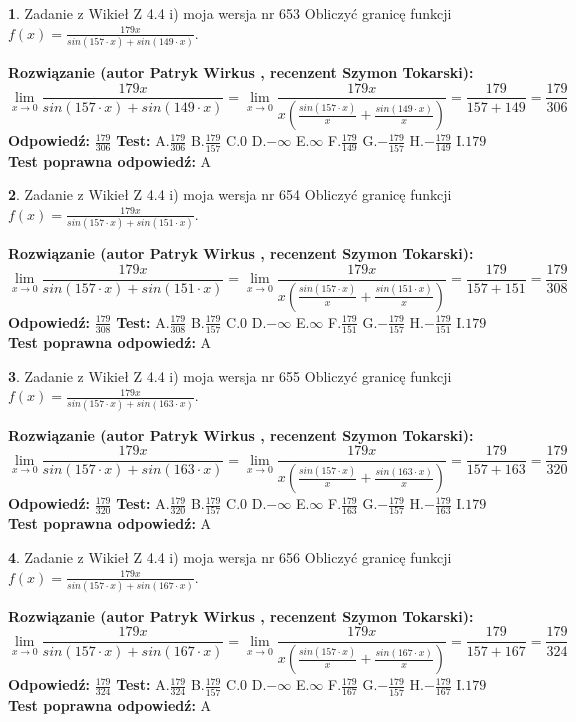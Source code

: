 \documentclass[12pt, a4paper]{article}
\theoremstyle{definition} %
\newtheorem{zad}{}
\newcommand{\zadStart}[1]{\begin{zad}#1\newline}
\newcommand{\zadStop}{\end{zad}}
\newcommand{\rozwStart}[2]{\noindent \textbf{Rozwiązanie (autor #1 , recenzent #2): }\newline}
\newcommand{\rozwStop}{\newline}
\newcommand{\odpStart}{\noindent \textbf{Odpowiedź:}\newline}
\newcommand{\odpStop}{\newline}
\newcommand{\testStart}{\noindent \textbf{Test:}\newline}
\newcommand{\testStop}{\newline}
\newcommand{\kluczStart}{\noindent \textbf{Test poprawna odpowiedź:}\newline}
\newcommand{\kluczStop}{\newline}
\begin{document}
\zadStart{Zadanie z Wikieł Z 4.4 i) moja wersja nr 653}
Obliczyć granicę funkcji $f(x)=\frac{179x}{sin(157\cdot x) +sin(149\cdot x)}$.
\zadStop
\rozwStart{Patryk Wirkus}{Szymon Tokarski}
$$\lim\limits_{x\to 0}\frac{179x}{sin(157\cdot x) +sin(149\cdot x)}=\lim\limits_{x\to 0}\frac{179x}{x(\frac{sin(157\cdot x)}{x}+\frac{sin(149\cdot x)}{x})}=\frac{179}{157+149} = \frac{179}{306}$$
\rozwStop
\odpStart
$\frac{179}{306}$
\odpStop
\testStart
A.$\frac{179}{306}$
B.$\frac{179}{157}$
C.$0$
D.$-\infty$
E.$\infty$
F.$\frac{179}{149}$
G.$-\frac{179}{157}$
H.$-\frac{179}{149}$
I.$179$
\testStop
\kluczStart
A
\kluczStop



\zadStart{Zadanie z Wikieł Z 4.4 i) moja wersja nr 654}
Obliczyć granicę funkcji $f(x)=\frac{179x}{sin(157\cdot x) +sin(151\cdot x)}$.
\zadStop
\rozwStart{Patryk Wirkus}{Szymon Tokarski}
$$\lim\limits_{x\to 0}\frac{179x}{sin(157\cdot x) +sin(151\cdot x)}=\lim\limits_{x\to 0}\frac{179x}{x(\frac{sin(157\cdot x)}{x}+\frac{sin(151\cdot x)}{x})}=\frac{179}{157+151} = \frac{179}{308}$$
\rozwStop
\odpStart
$\frac{179}{308}$
\odpStop
\testStart
A.$\frac{179}{308}$
B.$\frac{179}{157}$
C.$0$
D.$-\infty$
E.$\infty$
F.$\frac{179}{151}$
G.$-\frac{179}{157}$
H.$-\frac{179}{151}$
I.$179$
\testStop
\kluczStart
A
\kluczStop



\zadStart{Zadanie z Wikieł Z 4.4 i) moja wersja nr 655}
Obliczyć granicę funkcji $f(x)=\frac{179x}{sin(157\cdot x) +sin(163\cdot x)}$.
\zadStop
\rozwStart{Patryk Wirkus}{Szymon Tokarski}
$$\lim\limits_{x\to 0}\frac{179x}{sin(157\cdot x) +sin(163\cdot x)}=\lim\limits_{x\to 0}\frac{179x}{x(\frac{sin(157\cdot x)}{x}+\frac{sin(163\cdot x)}{x})}=\frac{179}{157+163} = \frac{179}{320}$$
\rozwStop
\odpStart
$\frac{179}{320}$
\odpStop
\testStart
A.$\frac{179}{320}$
B.$\frac{179}{157}$
C.$0$
D.$-\infty$
E.$\infty$
F.$\frac{179}{163}$
G.$-\frac{179}{157}$
H.$-\frac{179}{163}$
I.$179$
\testStop
\kluczStart
A
\kluczStop



\zadStart{Zadanie z Wikieł Z 4.4 i) moja wersja nr 656}
Obliczyć granicę funkcji $f(x)=\frac{179x}{sin(157\cdot x) +sin(167\cdot x)}$.
\zadStop
\rozwStart{Patryk Wirkus}{Szymon Tokarski}
$$\lim\limits_{x\to 0}\frac{179x}{sin(157\cdot x) +sin(167\cdot x)}=\lim\limits_{x\to 0}\frac{179x}{x(\frac{sin(157\cdot x)}{x}+\frac{sin(167\cdot x)}{x})}=\frac{179}{157+167} = \frac{179}{324}$$
\rozwStop
\odpStart
$\frac{179}{324}$
\odpStop
\testStart
A.$\frac{179}{324}$
B.$\frac{179}{157}$
C.$0$
D.$-\infty$
E.$\infty$
F.$\frac{179}{167}$
G.$-\frac{179}{157}$
H.$-\frac{179}{167}$
I.$179$
\testStop
\kluczStart
A
\kluczStop
\end{document}
